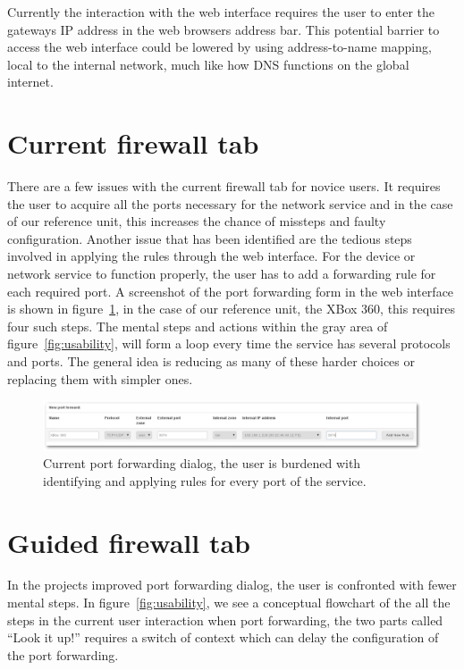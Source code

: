 \documentclass[a4paper,11pt,makeidx]{kth-bcs}
\begin{document}
Currently the interaction with the web interface requires the user to enter the gateways IP address in the web browsers address bar.
This potential barrier to access the web interface could be lowered by using address-to-name mapping, local to the internal network, much like how DNS functions on the global internet.

\section{Current firewall tab}
There are a few issues with the current firewall tab for novice users.
It requires the user to acquire all the ports necessary for the network service and in the case of our reference unit, this increases the chance of missteps and faulty configuration.
Another issue that has been identified are the tedious steps involved in applying the rules through the web interface.
For the device or network service to function properly, the user has to add a forwarding rule for each required port.
A screenshot of the port forwarding form in the web interface is shown in figure~\ref{fig:before}, in the case of our reference unit, the XBox 360, this requires four such steps.
The mental steps and actions within the gray area of figure~\ref{fig:usability}, will form a loop every time the service has several protocols and ports.
The general idea is reducing as many of these harder choices or replacing them with simpler ones.

\begin{figure}[h]
   \centering
   \includegraphics[width=17cm]{ss-before-shadow}
   \caption{Current port forwarding dialog, the user is burdened with identifying and applying rules for every port of the service.}
   \label{fig:before}
\end{figure}

\section{Guided firewall tab}
In the projects improved port forwarding dialog, the user is confronted with fewer mental steps.
In figure~\ref{fig:usability}, we see a conceptual flowchart of the all the steps in the current user interaction when port forwarding, the two parts called ``Look it up!'' requires a switch of context which can delay the configuration of the port forwarding.
\end{document}
